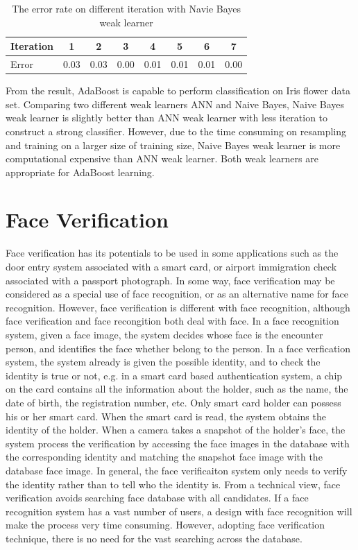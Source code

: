 \begin{table}\label{tab:erririsbayes}
\begin{center}
  \begin{tabular}{|l|c|c|c|c|c|c|c|}
 \hline
Iteration & 1 & 2 & 3 & 4 & 5 & 6 & 7 \\
\hline \hline
Error & 0.03 & 0.03 & 0.00 & 0.01 & 0.01 & 0.01 & 0.00 \\
\hline
\end{tabular} 
\end{center}
\caption{The error rate on different iteration with Navie Bayes weak learner}
\end{table} 
From the result, AdaBoost is capable to perform classification on Iris flower data set. Comparing two different weak learners ANN and Naive Bayes, Naive Bayes weak learner is slightly better than ANN weak learner with less iteration to construct a strong classifier. However, due to the time consuming on resampling and training on a larger size of training size, Naive Bayes weak learner is more computational expensive than ANN weak learner. Both weak learners are appropriate for AdaBoost learning.

\section{Face Verification}
Face verification has its potentials to be used in some applications such as the door entry system associated with a smart card, or airport immigration check associated with a passport photograph. In some way, face verification may be considered as a special use of face recognition, or as an alternative name for face recognition. However, face verification is different with face recognition, although face verification and face recongition both deal with face. In a face recognition system, given a face image, the system decides whose face is the encounter person, and identifies the face whether belong to the person. In a face verfication system, the system already is given the possible identity, and to check the identity is true or not, e.g. in a smart card based authentication system, a chip on the card contains all the information about the holder, such as the name, the date of birth, the registration number, etc. Only smart card holder can possess his or her smart card. When the smart card is read, the system obtains the identity of the holder. When a camera takes a snapshot of the holder's face, the system process the verification by accessing the face images in the database with the corresponding identity and matching the snapshot face image with the database face image. In general, the face verificaiton system only needs to verify the identity rather than to tell who the identity is. From a technical view, face verification avoids searching face database with all candidates. If a face recognition system has a vast number of users, a design with face recognition will make the process very time consuming. However, adopting face verification technique, there is no need for the vast searching across the database.


